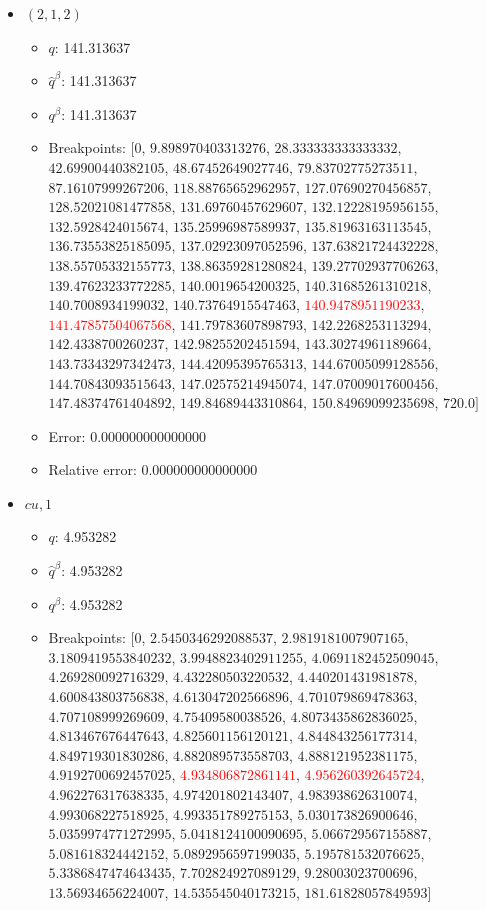 \documentclass{article}%
\begin{document}
\begin{itemize}
\begin{itemize}
		\item Error: 0.000000000000000%
		\item Relative error: 0.000000000000000%
	\end{itemize}%
	\item $(2, 1, 2)$%
	\begin{itemize}%
		\item $q$: 141.313637%
		\item $\hat{q}^\beta$: 141.313637%
		\item $q^\beta$: 141.313637%
		\item Breakpoints: $[$$0$, $9.898970403313276$, $28.333333333333332$, $42.69900440382105$, $48.67452649027746$, $79.83702775273511$, $87.16107999267206$, $118.88765652962957$, $127.07690270456857$, $128.52021081477858$, $131.69760457629607$, $132.12228195956155$, $132.5928424015674$, $135.25996987589937$, $135.81963163113545$, $136.73553825185095$, $137.02923097052596$, $137.63821724432228$, $138.55705332155773$, $138.86359281280824$, $139.27702937706263$, $139.47623233772285$, $140.0019654200325$, $140.31685261310218$, $140.7008934199032$, $140.73764915547463$, \textcolor{red}{$140.9478951190233$}, \textcolor{red}{$141.47857504067568$}, $141.79783607898793$, $142.2268253113294$, $142.4338700260237$, $142.98255202451594$, $143.30274961189664$, $143.73343297342473$, $144.42095395765313$, $144.67005099128556$, $144.70843093515643$, $147.02575214945074$, $147.07009017600456$, $147.48374761404892$, $149.84689443310864$, $150.84969099235698$, $720.0$$]$%
		\item Error: 0.000000000000000%
		\item Relative error: 0.000000000000000%
	\end{itemize}%
	\item $\textit{cu},1$%
	\begin{itemize}%
		\item $q$: 4.953282%
		\item $\hat{q}^\beta$: 4.953282%
		\item $q^\beta$: 4.953282%
		\item Breakpoints: $[$$0$, $2.5450346292088537$, $2.9819181007907165$, $3.1809419553840232$, $3.9948823402911255$, $4.0691182452509045$, $4.269280092716329$, $4.432280503220532$, $4.440201431981878$, $4.600843803756838$, $4.613047202566896$, $4.701079869478363$, $4.707108999269609$, $4.75409580038526$, $4.8073435862836025$, $4.813467676447643$, $4.825601156120121$, $4.844843256177314$, $4.849719301830286$, $4.882089573558703$, $4.888121952381175$, $4.9192700692457025$, \textcolor{red}{$4.934806872861141$}, \textcolor{red}{$4.956260392645724$}, $4.962276317638335$, $4.974201802143407$, $4.983938626310074$, $4.993068227518925$, $4.993351789275153$, $5.030173826900646$, $5.0359974771272995$, $5.0418124100090695$, $5.066729567155887$, $5.081618324442152$, $5.0892956597199035$, $5.195781532076625$, $5.3386847474643435$, $7.702824927089129$, $9.28003023700696$, $13.56934656224007$, $14.535545040173215$, $181.61828057849593$$]$%

\end{itemize}
\end{itemize}
\end{document}
